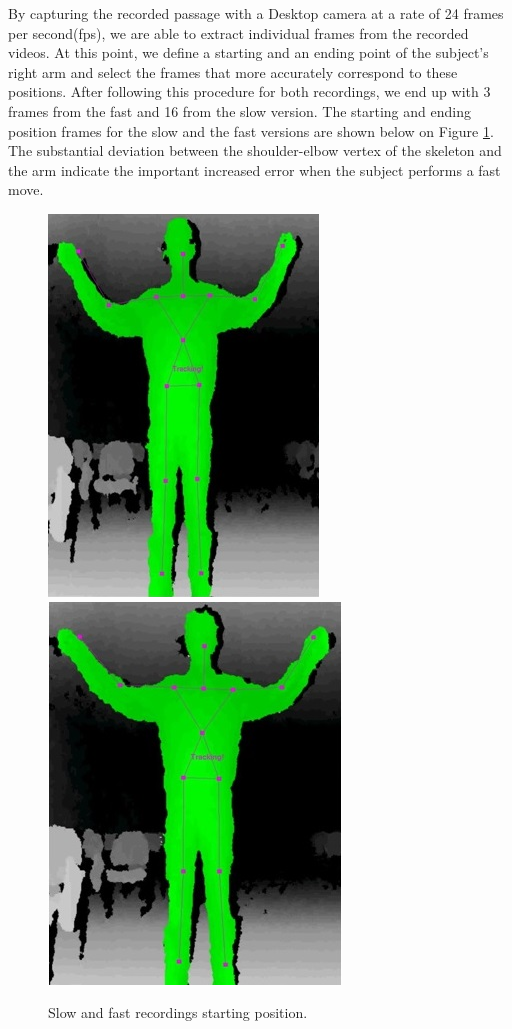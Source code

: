\documentclass[10pt]{article}
\begin{document}
By capturing the recorded passage with a Desktop camera at a rate of 24 frames per second(fps), we are able to extract individual frames from the recorded videos. At this point, we define a starting and an ending point of the subject's right arm and select the frames that more accurately correspond to these positions. After following this procedure for both recordings, we end up with 3 frames from the fast and 16 from the slow version. The starting and ending position frames for the slow and the fast versions are shown below on Figure \ref{start_pos}. The substantial deviation between the shoulder-elbow vertex of the skeleton and the arm indicate the important increased error when the subject performs a fast move.

\begin{figure}[h]
\center
\includegraphics[scale=0.5]{SlowStart.jpg} \includegraphics[scale=0.5]{FastStart.jpg}
\caption{Slow and fast recordings starting position.}
\label{start_pos}
\end{figure}
\end{document}
